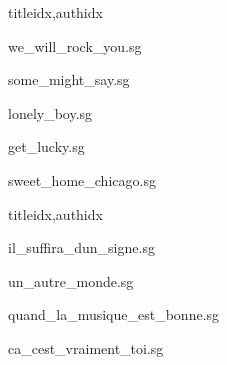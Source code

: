 \documentclass[
    ]{article}
\begin{document}
\begin{songs}{titleidx,authidx}

{we_will_rock_you.sg}


{some_might_say.sg}


{lonely_boy.sg}


{get_lucky.sg}


{sweet_home_chicago.sg}

\end{songs}


\begin{songs}{titleidx,authidx}

{il_suffira_dun_signe.sg}


{un_autre_monde.sg}


{quand_la_musique_est_bonne.sg}


{ca_cest_vraiment_toi.sg}

\end{songs}
\end{document}
